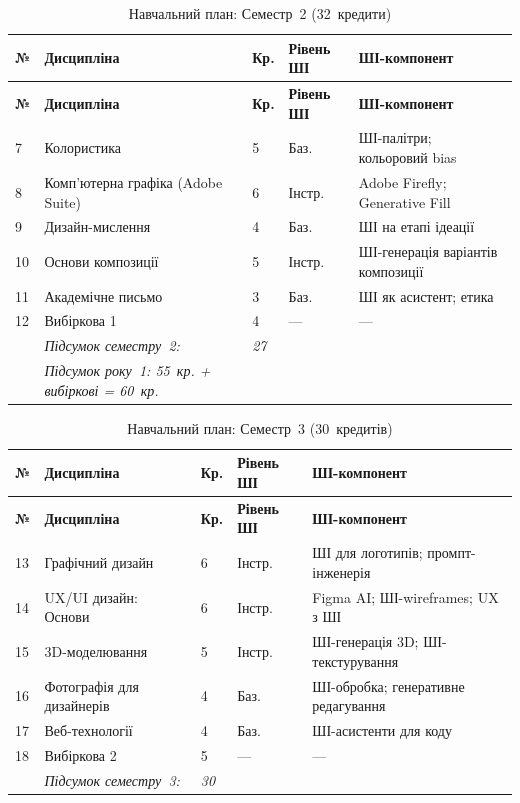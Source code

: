 \begin{longtable}{@{}p{}p{}p{}p{}p{}@{}}
\caption{Навчальний план: Семестр~2 (32~кредити)}\label{tab:app-sem2} \\
\hline
\textbf{№} & \textbf{Дисципліна} & \textbf{Кр.} & \textbf{Рівень ШІ} & \textbf{ШІ-компонент} \\
\hline
\endfirsthead
\hline
\textbf{№} & \textbf{Дисципліна} & \textbf{Кр.} & \textbf{Рівень ШІ} & \textbf{ШІ-компонент} \\
\hline
\endhead
7 & Колористика & 5 & Баз. & ШІ-палітри; кольоровий bias \\
8 & Комп'ютерна графіка (Adobe Suite) & 6 & Інстр. & Adobe Firefly; Generative Fill \\
9 & Дизайн-мислення & 4 & Баз. & ШІ на етапі ідеації \\
10 & Основи композиції & 5 & Інстр. & ШІ-генерація варіантів композиції \\
11 & Академічне письмо & 3 & Баз. & ШІ як асистент; етика \\
12 & Вибіркова 1 & 4 & --- & --- \\
\addlinespace
& \textit{Підсумок семестру~2:} & \textit{27} & & \\
& \textit{Підсумок року~1: 55~кр. + вибіркові = 60~кр.} & & & \\
\hline
\end{longtable}

\begin{longtable}{@{}p{}p{}p{}p{}p{}@{}}
\caption{Навчальний план: Семестр~3 (30~кредитів)}\label{tab:app-sem3} \\
\hline
\textbf{№} & \textbf{Дисципліна} & \textbf{Кр.} & \textbf{Рівень ШІ} & \textbf{ШІ-компонент} \\
\hline
\endfirsthead
\hline
\textbf{№} & \textbf{Дисципліна} & \textbf{Кр.} & \textbf{Рівень ШІ} & \textbf{ШІ-компонент} \\
\hline
\endhead
13 & Графічний дизайн & 6 & Інстр. & ШІ для логотипів; промпт-інженерія \\
14 & UX/UI дизайн: Основи & 6 & Інстр. & Figma AI; ШІ-wireframes; UX з ШІ \\
15 & 3D-моделювання & 5 & Інстр. & ШІ-генерація 3D; ШІ-текстурування \\
16 & Фотографія для дизайнерів & 4 & Баз. & ШІ-обробка; генеративне редагування \\
17 & Веб-технології & 4 & Баз. & ШІ-асистенти для коду \\
18 & Вибіркова 2 & 5 & --- & --- \\
\addlinespace
& \textit{Підсумок семестру~3:} & \textit{30} & & \\
\hline
\end{longtable}

